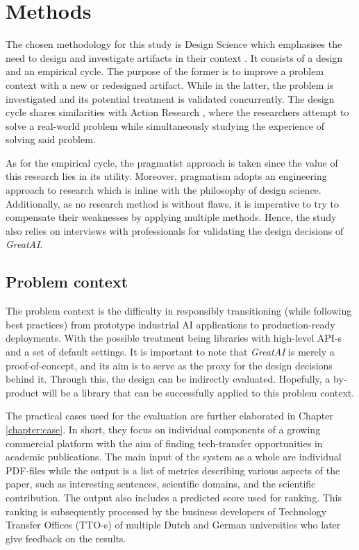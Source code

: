 \chapter{Methods} \label{chapter:methods}

The chosen methodology for this study is Design Science which emphasises the need to design and investigate artifacts in their context \cite{wieringa2014design}. It consists of a design and an empirical cycle. The purpose of the former is to improve a problem context with a new or redesigned artifact. While in the latter, the problem is investigated and its potential treatment is validated concurrently. The design cycle shares similarities with Action Research \cite{davison2004principles}, where the researchers attempt to solve a real-world problem while simultaneously studying the experience of solving said problem. 

As for the empirical cycle, the pragmatist approach is taken since the value of this research lies in its utility. Moreover, pragmatism adopts an engineering approach to research \cite{shull2007guide} which is inline with the philosophy of design science. Additionally, as no research method is without flaws, it is imperative to try to compensate their weaknesses by applying multiple methods. Hence, the study also relies on interviews with professionals for validating the design decisions of \textit{GreatAI}.

\section{Problem context}

The problem context is the difficulty in responsibly transitioning (while following best practices) from prototype industrial AI applications to production-ready deployments. With the possible treatment being libraries with high-level API-s and a set of default settings. It is important to note that \textit{GreatAI} is merely a proof-of-concept, and its aim is to serve as the proxy for the design decisions behind it. Through this, the design can be indirectly evaluated. Hopefully, a by-product will be a library that can be successfully applied to this problem context.

The practical cases used for the evaluation are further elaborated in Chapter \ref{chapter:case}. In short, they focus on individual components of a growing commercial platform with the aim of finding tech-transfer opportunities in academic publications. The main input of the system as a whole are individual PDF-files while the output is a list of metrics describing various aspects of the paper, such as interesting sentences, scientific domains, and the scientific contribution. The output also includes a predicted score used for ranking. This ranking is subsequently processed by the business developers of Technology Transfer Offices (TTO-s) of multiple Dutch and German universities who later give feedback on the results.

